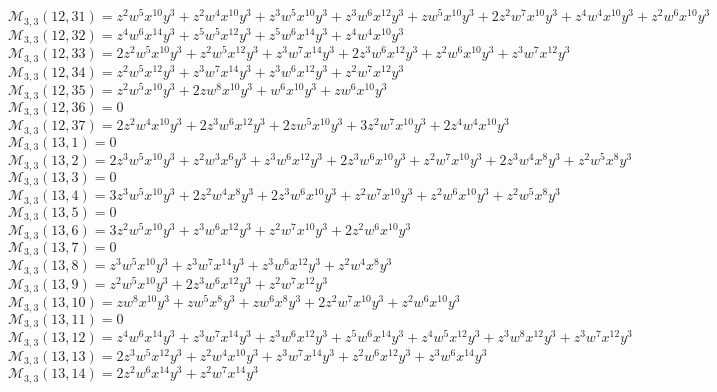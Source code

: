 \documentclass[12pt]{memoireuqam1.3}
\begin{document}
$\mathcal{M}_{3,3}(12,31)=z^2w^5x^{10}y^3+z^2w^4x^{10}y^3+z^3w^5x^{10}y^3+z^3w^6x^{12}y^3+zw^5x^{10}y^3+2z^2w^7x^{10}y^3+z^4w^4x^{10}y^3+z^2w^6x^{10}y^3$\\
$\mathcal{M}_{3,3}(12,32)=z^4w^6x^{14}y^3+z^5w^5x^{12}y^3+z^5w^6x^{14}y^3+z^4w^4x^{10}y^3$\\
$\mathcal{M}_{3,3}(12,33)=2z^2w^5x^{10}y^3+z^2w^5x^{12}y^3+z^3w^7x^{14}y^3+2z^3w^6x^{12}y^3+z^2w^6x^{10}y^3+z^3w^7x^{12}y^3$\\
$\mathcal{M}_{3,3}(12,34)=z^2w^5x^{12}y^3+z^3w^7x^{14}y^3+z^3w^6x^{12}y^3+z^2w^7x^{12}y^3$\\
$\mathcal{M}_{3,3}(12,35)=z^2w^5x^{10}y^3+2zw^8x^{10}y^3+w^6x^{10}y^3+zw^6x^{10}y^3$\\
$\mathcal{M}_{3,3}(12,36)=0$\\
$\mathcal{M}_{3,3}(12,37)=2z^2w^4x^{10}y^3+2z^3w^6x^{12}y^3+2zw^5x^{10}y^3+3z^2w^7x^{10}y^3+2z^4w^4x^{10}y^3$\\
$\mathcal{M}_{3,3}(13,1)=0$\\
$\mathcal{M}_{3,3}(13,2)=2z^3w^5x^{10}y^3+z^2w^3x^6y^3+z^3w^6x^{12}y^3+2z^3w^6x^{10}y^3+z^2w^7x^{10}y^3+2z^3w^4x^8y^3+z^2w^5x^8y^3$\\
$\mathcal{M}_{3,3}(13,3)=0$\\
$\mathcal{M}_{3,3}(13,4)=3z^3w^5x^{10}y^3+2z^2w^4x^8y^3+2z^3w^6x^{10}y^3+z^2w^7x^{10}y^3+z^2w^6x^{10}y^3+z^2w^5x^8y^3$\\
$\mathcal{M}_{3,3}(13,5)=0$\\
$\mathcal{M}_{3,3}(13,6)=3z^2w^5x^{10}y^3+z^3w^6x^{12}y^3+z^2w^7x^{10}y^3+2z^2w^6x^{10}y^3$\\
$\mathcal{M}_{3,3}(13,7)=0$\\
$\mathcal{M}_{3,3}(13,8)=z^3w^5x^{10}y^3+z^3w^7x^{14}y^3+z^3w^6x^{12}y^3+z^2w^4x^8y^3$\\
$\mathcal{M}_{3,3}(13,9)=z^2w^5x^{10}y^3+2z^3w^6x^{12}y^3+z^2w^7x^{12}y^3$\\
$\mathcal{M}_{3,3}(13,10)=zw^8x^{10}y^3+zw^5x^8y^3+zw^6x^8y^3+2z^2w^7x^{10}y^3+z^2w^6x^{10}y^3$\\
$\mathcal{M}_{3,3}(13,11)=0$\\
$\mathcal{M}_{3,3}(13,12)=z^4w^6x^{14}y^3+z^3w^7x^{14}y^3+z^3w^6x^{12}y^3+z^5w^6x^{14}y^3+z^4w^5x^{12}y^3+z^3w^8x^{12}y^3+z^3w^7x^{12}y^3$\\
$\mathcal{M}_{3,3}(13,13)=2z^3w^5x^{12}y^3+z^2w^4x^{10}y^3+z^3w^7x^{14}y^3+z^2w^6x^{12}y^3+z^3w^6x^{14}y^3$\\
$\mathcal{M}_{3,3}(13,14)=2z^2w^6x^{14}y^3+z^2w^7x^{14}y^3$\\
\end{document}
